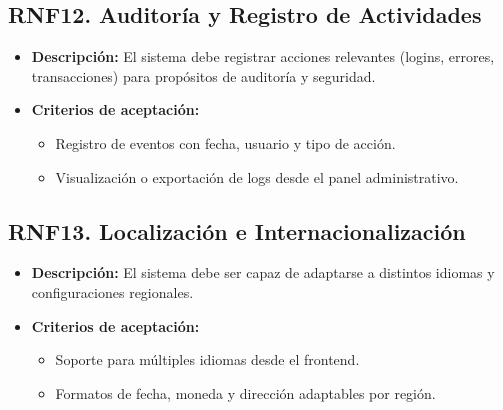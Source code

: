 	\subsection*{RNF12. Auditoría y Registro de Actividades}
		\begin{itemize}
			\item \textbf{Descripción:} El sistema debe registrar acciones relevantes (logins, errores, transacciones) para propósitos de auditoría y seguridad.
			\item \textbf{Criterios de aceptación:}
			\begin{itemize}
				\item Registro de eventos con fecha, usuario y tipo de acción.
				\item Visualización o exportación de logs desde el panel administrativo.
			\end{itemize}
		\end{itemize}
		
	\subsection*{RNF13. Localización e Internacionalización}
		\begin{itemize}
			\item \textbf{Descripción:} El sistema debe ser capaz de adaptarse a distintos idiomas y configuraciones regionales.
			\item \textbf{Criterios de aceptación:}
			\begin{itemize}
				\item Soporte para múltiples idiomas desde el frontend.
				\item Formatos de fecha, moneda y dirección adaptables por región.
			\end{itemize}
		\end{itemize}